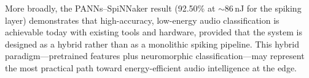 More broadly, the PANNs--SpiNNaker result (92.50\% at $\sim$86\,nJ for the spiking layer) demonstrates that high-accuracy, low-energy audio classification is achievable today with existing tools and hardware, provided that the system is designed as a hybrid rather than as a monolithic spiking pipeline. This hybrid paradigm---pretrained features plus neuromorphic classification---may represent the most practical path toward energy-efficient audio intelligence at the edge.
